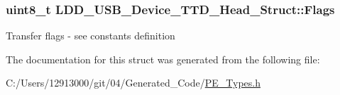 \subsubsection[{Flags}]{\setlength{\rightskip}{0pt plus 5cm}uint8\+\_\+t L\+D\+D\+\_\+\+U\+S\+B\+\_\+\+Device\+\_\+\+T\+T\+D\+\_\+\+Head\+\_\+\+Struct\+::\+Flags}\label{struct_l_d_d___u_s_b___device___t_t_d___head___struct_a9572bb866ff1f22ed881f3ff618c0445}
Transfer flags -\/ see constants definition 

The documentation for this struct was generated from the following file\+:\begin{DoxyCompactItemize}
\item 
C\+:/\+Users/12913000/git/04/\+Generated\+\_\+\+Code/\hyperlink{_p_e___types_8h}{P\+E\+\_\+\+Types.\+h}\end{DoxyCompactItemize}
